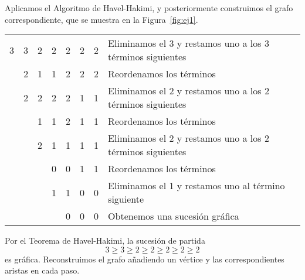 \documentclass[12pt]{article}
\begin{document}
    \begin{ejercicio}
        Aplicamos el Algoritmo de Havel-Hakimi, y posteriormente construimos el grafo correspondiente, que se muestra en la Figura~\ref{fig:ej1}.

        \begin{table}[H]
            \centering
            \begin{tabular}{ccccccc|l}
                3 & 3 & 2 & 2 & 2 & 2 & 2 & Eliminamos el 3 y restamos uno a los 3 términos siguientes\\
                  & 2 & 1 & 1 & 2 & 2 & 2 & Reordenamos los términos\\
                  & 2 & 2 & 2 & 2 & 1 & 1 & Eliminamos el 2 y restamos uno a los 2 términos siguientes\\
                  &   & 1 & 1 & 2 & 1 & 1 & Reordenamos los términos\\
                  &   & 2 & 1 & 1 & 1 & 1 & Eliminamos el 2 y restamos uno a los 2 términos siguientes\\
                  &   &   & 0 & 0 & 1 & 1 & Reordenamos los términos\\
                  &   &   & 1 & 1 & 0 & 0 & Eliminamos el 1 y restamos uno al término siguiente\\
                  &   &   &   & 0 & 0 & 0 & Obtenemos una sucesión gráfica
            \end{tabular}
        \end{table}
        Por el Teorema de Havel-Hakimi, la sucesión de partida $$3 \ge 3 \ge 2 \ge 2 \ge 2 \ge 2 \ge 2$$ es gráfica. Reconstruimos el grafo añadiendo un vértice y las correspondientes aristas en cada paso.

        \begin{figure}[H]
            \centering
            \label{fig:ej11}
        \end{figure}

        \begin{figure}[H]
            \centering
\end{figure}
\end{ejercicio}
\end{document}
